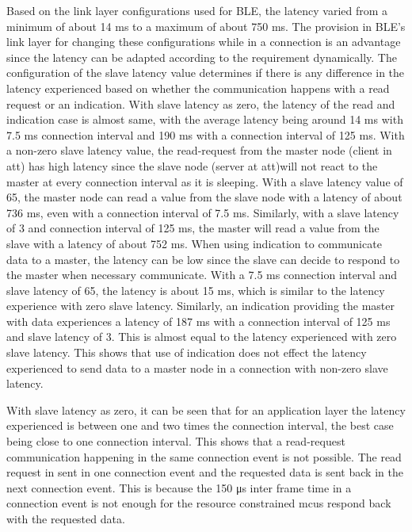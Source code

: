 Based on the link layer configurations used for BLE, the latency varied from a minimum of about 14 ms to a maximum of about 750 ms. The provision in BLE's link layer for changing these configurations while in a connection is an advantage since the latency can be adapted according to the requirement dynamically. The configuration of the slave latency value determines if there is any difference in the latency experienced based on whether the communication happens with a read request or an indication. With slave latency as zero, the latency of the read and indication case is almost same, with the average latency being around 14 ms with 7.5 ms connection interval and 190 ms with a connection interval of 125 ms. With a non-zero slave latency value, the read-request from the master node (client in \gls{att}) has high latency since the slave node (server at \gls{att})will not react to the master at every connection interval as it is sleeping. With a slave latency value of 65, the master node can read a value from the slave node with a latency of about 736 ms, even with a connection interval of 7.5 ms. Similarly, with a slave latency of 3 and connection interval of 125 ms, the master will read a value from the slave with a latency of about 752 ms. When using indication to communicate data to a master, the latency can be low since the slave can decide to respond to the master when necessary communicate. With a 7.5 ms connection interval and slave latency of 65, the latency is about 15 ms, which is similar to the latency experience with zero slave latency. Similarly, an indication providing the master with data experiences a latency of 187 ms with a connection interval of 125 ms and slave latency of 3. This is almost equal to the latency experienced with zero slave latency. This shows that use of indication does not effect the latency experienced to send data to a master node in a connection with non-zero slave latency.

With slave latency as zero, it can be seen that for an application layer the latency experienced is between one and two times the connection interval, the best case being close to one connection interval. This shows that a read-request communication happening in the same connection event is not possible. The read request in sent in one connection event and the requested data is sent back in the next connection event. This is because the 150 \si{\micro \second} inter frame time in a connection event is not enough for the resource constrained \glspl{mcu} respond back with the requested data.

